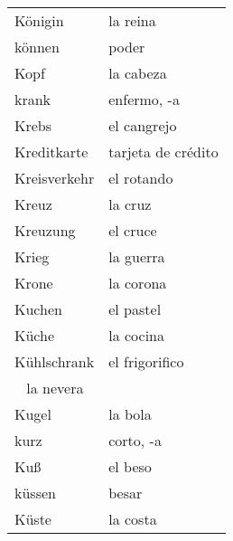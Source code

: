 \begin{longtable}{p{} p{}}
Königin & la reina\\
können & poder\\
Kopf & la cabeza\\
krank & enfermo, -a\\
Krebs & el cangrejo\\
Kreditkarte & tarjeta de crédito\\
Kreisverkehr & el rotando\\
Kreuz & la cruz\\
Kreuzung & el cruce\\
Krieg & la guerra\\
Krone & la corona\\
Kuchen & el pastel\\
Küche & la cocina\\
Kühlschrank & el frigorifico\\
~ la nevera\\
Kugel & la bola\\
kurz & corto, -a\\
Kuß & el beso\\
küssen & besar\\
Küste & la costa\\
\end{longtable}
